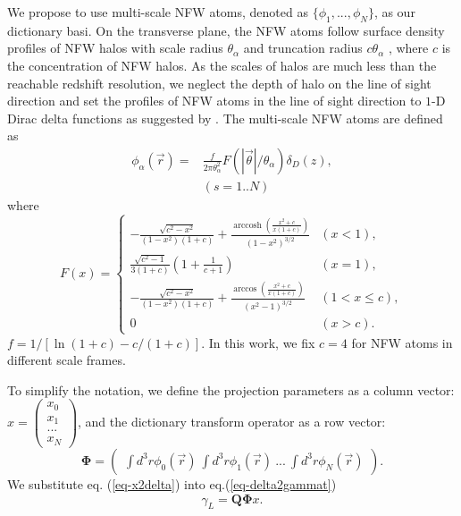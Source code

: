 \documentclass[twocolumn]{aastex62}
\DeclareMathOperator{\arccosh}{arccosh}
\begin{document}
We propose to use multi-scale NFW atoms, denoted as $\{\phi_1,...,\phi_N\}$, as our dictionary basi.
On the transverse plane, the NFW atoms follow surface density profiles of NFW halos
\citep{haloModel-TJ2003-3pt} with scale radius $\theta_\alpha$ and truncation radius $c \theta_\alpha$ ,
where $c$ is the concentration of NFW halos.
As the scales of halos are much less than the reachable redshift resolution, we neglect the depth of halo on the
line of sight direction and set the profiles of NFW atoms in the line of sight direction to $1$-D Dirac delta
functions as suggested by \citep{LSS-massMap-Glimpse3D-Leonard2014}.
The multi-scale NFW atoms are defined as
\begin{equation}
\begin{split}
\phi_\alpha(\vec{r}) =&\frac{f }{2 \pi \theta_\alpha^2 } F(|\vec{\theta}|/\theta_\alpha) \delta_D(z),\\
&  (s=1..N)
\end{split}
\end{equation}
where
\begin{equation}
F(x)=
\begin{cases}
-\frac{\sqrt{c^2-x^2}}{(1-x^2)(1+c)} + \frac{\arccosh \left(\frac{x^2+c}{x(1+c)}\right)}{(1-x^2)^{3/2}}  & (x<1),\\
\frac{\sqrt{c^2-1}}{3(1+c)} (1+\frac{1}{c+1}) & (x=1),\\
-\frac{\sqrt{c^2-x^2}}{(1-x^2)(1+c)} + \frac{\arccos\left(\frac{x^2+c}{x(1+c)}\right)}{(x^2-1)^{3/2}} & (1<x\leq c),\\
0& (x>c).
\end{cases}
\end{equation}
$f=1/[\ln (1+c)-c/(1+c)]$. In this work, we fix $c=4$ for NFW atoms in different scale frames.

To simplify the notation, we define the projection parameters as a column vector:
$x=\begin{pmatrix}
x_{0}\\
x_{1}\\
...\\
x_{N}
\end{pmatrix}$,
and the dictionary transform operator as a row vector:
\begin{equation}
\mathbf{\Phi}=\begin{pmatrix}
\int d^3r\phi_0(\vec{r}) ~\int d^3r \phi_1(\vec{r})~ ...~\int d^3r \phi_{N}(\vec{r})
\end{pmatrix}.
\end{equation}
We substitute eq. (\ref{eq-x2delta}) into eq.(\ref{eq-delta2gammat})
\begin{equation}\label{eq-x2gammat}
\gamma_L=\mathbf{Q}\mathbf{\Phi} x.
\end{equation}
\end{document}
